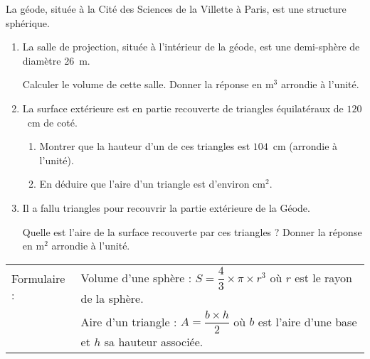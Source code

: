 
\medskip

La géode, située à la Cité des Sciences de la Villette à Paris, est une
structure sphérique.

\medskip

\begin{enumerate}
\item La salle de projection, située à l'intérieur de la géode, est une
demi-sphère de diamètre 26~m.

Calculer le volume de cette salle. Donner la réponse en m$^3$ arrondie à l'unité.
\item La surface extérieure est en partie recouverte de triangles équilatéraux de $120$~cm de coté.
	\begin{enumerate}
		\item Montrer que la hauteur d'un de ces triangles est $104$~cm (arrondie à l'unité).
		\item En déduire que l'aire d'un triangle est d'environ cm$^2$.
 	\end{enumerate}
\item Il a fallu  triangles pour recouvrir la partie extérieure de la Géode.
	
Quelle est l'aire de la surface recouverte par ces triangles ? Donner la réponse en m$^2$ arrondie à l'unité.
\end{enumerate}

\medskip

\begin{tabularx}{\linewidth}{|l X|}\hline
Formulaire :& Volume d'une sphère : $S = \dfrac{4}{3} \times \pi \times r^3$ où $r$ est le rayon de la sphère.\rule[-3mm]{0mm}{9mm}\\
&Aire d'un triangle :  $A = \dfrac{b \times h}{2}$ où $b$ est l'aire d'une base et $h$ sa hauteur associée.\rule[-3mm]{0mm}{9mm}\\ \hline
\end{tabularx}

\vspace{0,5cm}

